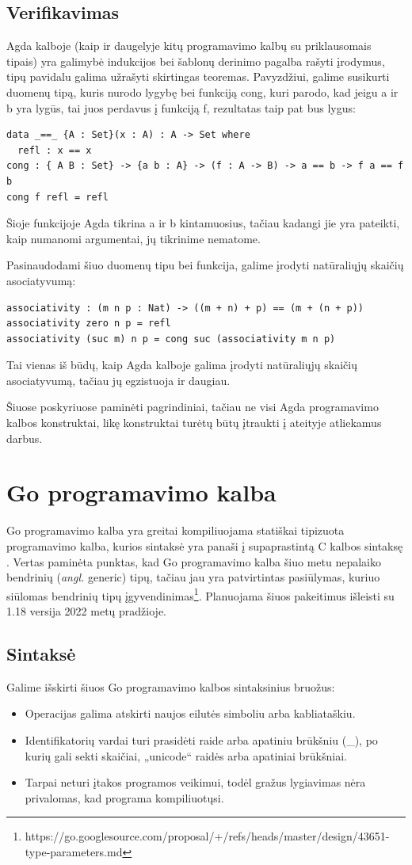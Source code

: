 \documentclass{VUMIFPSbakalaurinis}
\begin{document}
\subsection{Verifikavimas}
Agda kalboje (kaip ir daugelyje kitų programavimo kalbų su priklausomais tipais) yra galimybė indukcijos bei šablonų derinimo pagalba rašyti įrodymus, tipų pavidalu galima užrašyti skirtingas teoremas. Pavyzdžiui, galime susikurti duomenų tipą, kuris nurodo lygybę bei funkciją cong, kuri parodo, kad jeigu a ir b yra lygūs, tai juos perdavus į funkciją f, rezultatas taip pat bus lygus:
\begin{lstlisting}
data _==_ {A : Set}(x : A) : A -> Set where
  refl : x == x
cong : { A B : Set} -> {a b : A} -> (f : A -> B) -> a == b -> f a == f b
cong f refl = refl
	\end{lstlisting}
Šioje funkcijoje Agda tikrina a ir b kintamuosius, tačiau kadangi jie yra pateikti, kaip numanomi argumentai, jų tikrinime nematome.\par Pasinaudodami šiuo duomenų tipu bei funkcija, galime įrodyti natūraliųjų  skaičių asociatyvumą:
\begin{lstlisting}
associativity : (m n p : Nat) -> ((m + n) + p) == (m + (n + p))
associativity zero n p = refl
associativity (suc m) n p = cong suc (associativity m n p)
\end{lstlisting}
Tai vienas iš būdų, kaip Agda kalboje galima įrodyti natūraliųjų skaičių asociatyvumą, tačiau jų egzistuoja ir daugiau.
\par Šiuose poskyriuose paminėti pagrindiniai, tačiau ne visi Agda programavimo kalbos konstruktai, likę konstruktai turėtų būtų įtraukti į ateityje atliekamus darbus.
\section{Go programavimo kalba}
Go programavimo kalba yra greitai kompiliuojama statiškai tipizuota programavimo kalba, kurios sintaksė yra panaši į supaprastintą C kalbos sintaksę \cite{Go}. Vertas paminėta punktas, kad Go programavimo kalba šiuo metu nepalaiko bendrinių (\textit{angl.} generic) tipų, tačiau jau yra patvirtintas pasiūlymas, kuriuo siūlomas bendrinių tipų įgyvendinimas\footnote{https://go.googlesource.com/proposal/+/refs/heads/master/design/43651-type-parameters.md}. Planuojama šiuos pakeitimus išleisti su 1.18 versija 2022 metų pradžioje.
\subsection{Sintaksė}
Galime išskirti šiuos Go programavimo kalbos sintaksinius bruožus:
\begin{itemize}
	\item Operacijas galima atskirti naujos eilutės simboliu arba kabliataškiu.
	\item Identifikatorių vardai turi prasidėti raide arba apatiniu brūkšniu (\_), po kurių gali sekti skaičiai, „unicode“ raidės arba apatiniai brūkšniai.
	\item Tarpai neturi įtakos programos veikimui, todėl gražus lygiavimas nėra privalomas, kad programa kompiliuotųsi.
\end{itemize}
\end{document}
